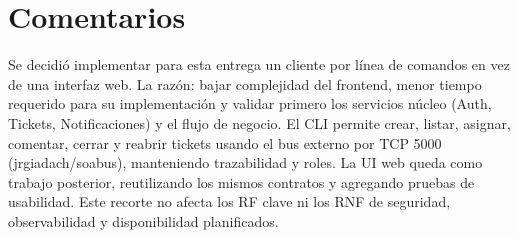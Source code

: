 \documentclass[letter,12pt]{article}
\begin{document}
\section{Comentarios}

Se decidió implementar para esta entrega un cliente por línea de comandos en vez de una interfaz web. La razón: bajar complejidad del frontend, menor tiempo requerido para su implementación y validar primero los servicios núcleo (Auth, Tickets, Notificaciones) y el flujo de negocio. El CLI permite crear, listar, asignar, comentar, cerrar y reabrir tickets usando el bus externo por TCP 5000 (jrgiadach/soabus), manteniendo trazabilidad y roles. La UI web queda como trabajo posterior, reutilizando los mismos contratos y agregando pruebas de usabilidad. Este recorte no afecta los RF clave ni los RNF de seguridad, observabilidad y disponibilidad planificados.
\end{document}
